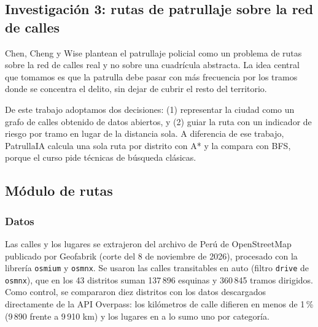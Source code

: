 %

\subsection{Investigación 3: rutas de patrullaje sobre la red de calles}
Chen, Cheng y Wise \cite{chen2017} plantean el patrullaje policial como un problema de rutas sobre la red de calles real y no sobre una cuadrícula abstracta. La idea central que tomamos es que la patrulla debe pasar con más frecuencia por los tramos donde se concentra el delito, sin dejar de cubrir el resto del territorio. %

De este trabajo adoptamos dos decisiones: (1) representar la ciudad como un grafo de calles obtenido de datos abiertos, y (2) guiar la ruta con un indicador de riesgo por tramo en lugar de la distancia sola. A diferencia de ese trabajo, PatrullaIA calcula una sola ruta por distrito con A* y la compara con BFS, porque el curso pide técnicas de búsqueda clásicas. %

\subsection{Módulo de rutas}

\subsubsection{Datos}
Las calles y los lugares se extrajeron del archivo de Perú de OpenStreetMap publicado por Geofabrik (corte del 8 de noviembre de 2026), procesado con la librería \texttt{osmium} y \texttt{osmnx}. Se usaron las calles transitables en auto (filtro \texttt{drive} de \texttt{osmnx}), que en los 43 distritos suman 137\,896 esquinas y 360\,845 tramos dirigidos. Como control, se compararon diez distritos con los datos descargados directamente de la API Overpass: los kilómetros de calle difieren en menos de 1\,\% (9\,890 frente a 9\,910 km) y los lugares en a lo sumo uno por categoría.

